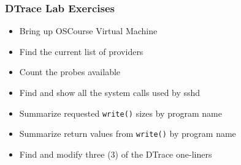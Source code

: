 \documentclass[pdftex,handout]{beamer}
\begin{document}
\begin{frame}[fragile]
  \frametitle{DTrace Lab Exercises}
  \begin{itemize}
  \item Bring up OSCourse Virtual Machine
  \item Find the current list of providers
  \item Count the probes available
  \item Find and show all the system calls used by sshd
  \item Summarize requested \verb|write()| sizes by program name
  \item Summarize return values from \verb|write()| by program name
  \item Find and modify three (3) of the DTrace one-liners
  \end{itemize}
\end{frame}
\end{document}
